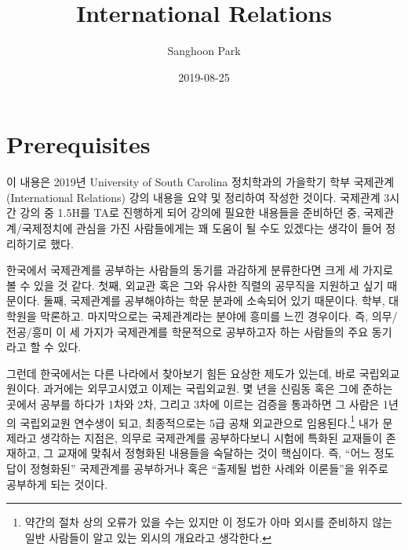 \documentclass[]{book}
\title{International Relations}
\author{Sanghoon Park}
\date{2019-08-25}
\let\rmarkdownfootnote\footnote%
\def\footnote{\protect\rmarkdownfootnote}
\begin{document}
\maketitle

{
\hypersetup{linkcolor=black}
\setcounter{tocdepth}{1}
\tableofcontents
}
\hypertarget{prerequisites}{%
\chapter{Prerequisites}\label{prerequisites}}

이 내용은 2019년 University of South Carolina 정치학과의 가을학기 학부 국제관계(International Relations) 강의 내용을 요약 및 정리하여 작성한 것이다. 국제관계 3시간 강의 중 1.5H를 TA로 진행하게 되어 강의에 필요한 내용들을 준비하던 중, 국제관계/국제정치에 관심을 가진 사람들에게는 꽤 도움이 될 수도 있겠다는 생각이 들어 정리하기로 했다.

한국에서 국제관계를 공부하는 사람들의 동기를 과감하게 분류한다면 크게 세 가지로 볼 수 있을 것 같다. 첫째, 외교관 혹은 그와 유사한 직렬의 공무직을 지원하고 싶기 때문이다. 둘째, 국제관계를 공부해야하는 학문 분과에 소속되어 있기 때문이다. 학부, 대학원을 막론하고. 마지막으로는 국제관계라는 분야에 흥미를 느낀 경우이다. 즉, 의무/전공/흥미 이 세 가지가 국제관계를 학문적으로 공부하고자 하는 사람들의 주요 동기라고 할 수 있다.

그런데 한국에서는 다른 나라에서 찾아보기 힘든 요상한 제도가 있는데, 바로 국립외교원이다. 과거에는 외무고시였고 이제는 국립외교원. 몇 년을 신림동 혹은 그에 준하는 곳에서 공부를 하다가 1차와 2차, 그리고 3차에 이르는 검증을 통과하면 그 사람은 1년의 국립외교원 연수생이 되고, 최종적으로는 5급 공채 외교관으로 임용된다.\footnote{약간의 절차 상의 오류가 있을 수는 있지만 이 정도가 아마 외시를 준비하지 않는 일반 사람들이 알고 있는 외시의 개요라고 생각한다.} 내가 문제라고 생각하는 지점은, 의무로 국제관계를 공부하다보니 시험에 특화된 교재들이 존재하고, 그 교재에 맞춰서 정형화된 내용들을 숙달하는 것이 핵심이다. 즉, ``어느 정도 답이 정형화된'' 국제관계를 공부하거나 혹은 ``출제될 법한 사례와 이론들''을 위주로 공부하게 되는 것이다.
\end{document}

